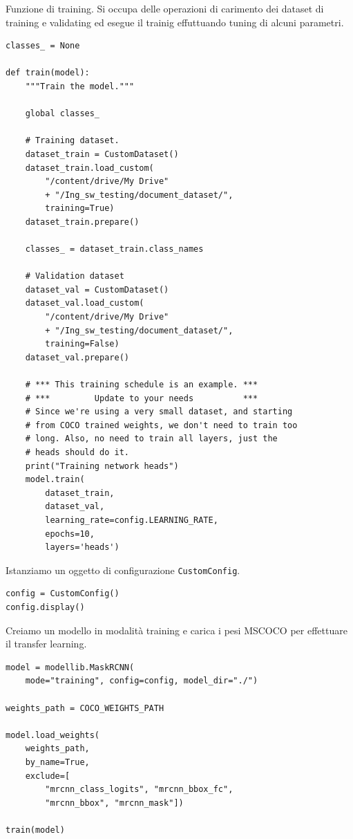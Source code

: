 \documentclass[12pt,a4paper]{article}
\begin{document}
Funzione di training.
Si occupa delle operazioni di carimento dei dataset di
training e validating ed esegue il trainig effuttuando tuning
di alcuni parametri.

\begin{verbatim}
classes_ = None

def train(model):
    """Train the model."""

    global classes_

    # Training dataset.
    dataset_train = CustomDataset()
    dataset_train.load_custom(
        "/content/drive/My Drive"
        + "/Ing_sw_testing/document_dataset/",
        training=True)
    dataset_train.prepare()

    classes_ = dataset_train.class_names

    # Validation dataset
    dataset_val = CustomDataset()
    dataset_val.load_custom(
        "/content/drive/My Drive"
        + "/Ing_sw_testing/document_dataset/",
        training=False)
    dataset_val.prepare()

    # *** This training schedule is an example. ***
    # ***         Update to your needs          ***
    # Since we're using a very small dataset, and starting
    # from COCO trained weights, we don't need to train too
    # long. Also, no need to train all layers, just the
    # heads should do it.
    print("Training network heads")
    model.train(
        dataset_train,
        dataset_val,
        learning_rate=config.LEARNING_RATE,
        epochs=10,
        layers='heads')
\end{verbatim}

Istanziamo un oggetto di configurazione \texttt{CustomConfig}.

\begin{verbatim}
config = CustomConfig()
config.display()
\end{verbatim}

Creiamo un modello in modalità training e carica i pesi MSCOCO per
effettuare il transfer learning.

\begin{verbatim}
model = modellib.MaskRCNN(
    mode="training", config=config, model_dir="./")

weights_path = COCO_WEIGHTS_PATH

model.load_weights(
    weights_path,
    by_name=True,
    exclude=[
        "mrcnn_class_logits", "mrcnn_bbox_fc",
        "mrcnn_bbox", "mrcnn_mask"])

train(model)
\end{verbatim}
\end{document}
